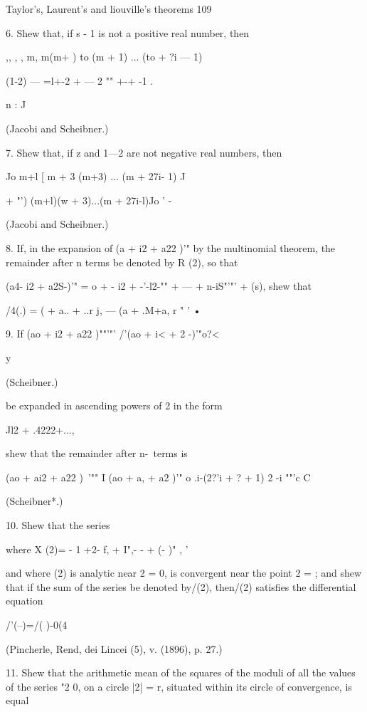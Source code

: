 {{{{Taylor's, Laurent's and liouville's theorems 109

6. Shew that, if s - 1 is not a positive real number, then

,, , , m, m(m+ ) to (m + 1) ... (to + ?i — 1)

(1-2) — =l+-2 + — 2 "" +-+ -1 .

n : J

(Jacobi and Scheibner.)

7. Shew that, if z and 1—2 are not negative real numbers, then

  Jo m+l [ m + 3 (m+3) ... (m + 27i- 1) J

+ "') (m+l)(w + 3)...(m + 27i-l)Jo ' -

(Jacobi and Scheibner.)

8. If, in the expansion of (a + i2 + a22 )'" by the multinomial
theorem, the remainder after n terms be denoted by R (2), so that

(a4- i2 + a2S-)'" = o + - i2 + -'-l2-"" + --- + n-iS"'"' + (s), shew
that



/4(.) = ( + a.. + ..r j, — (a + .M+a, r " ' •

9. If (ao + i2 + a22 )""'"' /'(ao + i< + 2 -)'"o?<

y



(Scheibner.)



be expanded in ascending powers of 2 in the form

Jl2 + .4222+...,

shew that the remainder after n-\ terms is

(ao + ai2 + a22 )~'"" I (ao + a, + a2 )'" o .i-(2?'i + ? + 1) 2 -i
""'c C

(Scheibner*.)

10. Shew that the series

where X (2)= - 1 +2- f, + I",- - + (- )" , '

and where (2) is analytic near 2 = 0, is convergent near the point 2 =
; and shew that if the sum of the series be denoted by/(2), then/(2)
satisfies the differential equation

/'(--)=/( )-0(4

(Pincherle, Rend, dei Lincei (5), v. (1896), p. 27.)

11. Shew that the arithmetic mean of the squares of the moduli of all
the values of the series "2 0, on a circle |2| = r, situated within
its circle of convergence, is equal

}}}}
